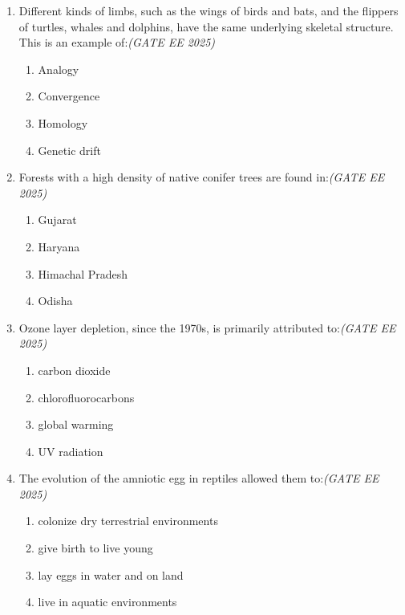 \begin{enumerate}[leftmargin=*,label=\textbf{Q.\arabic*}]

\item Different kinds of limbs, such as the wings of birds and bats, and the flippers of turtles, whales and dolphins, have the same underlying skeletal structure. This is an example of:\hfill \textit{(GATE EE 2025)}
\begin{multicols}{2}
\begin{enumerate}[label=(\Alph*)]
\item Analogy
\item Convergence
\item Homology
\item Genetic drift
\end{enumerate}
\end{multicols}

\item Forests with a high density of native conifer trees are found in:\hfill \textit{(GATE EE 2025)}
\begin{multicols}{2}
\begin{enumerate}[label=(\Alph*)]
\item Gujarat
\item Haryana
\item Himachal Pradesh
\item Odisha
\end{enumerate}
\end{multicols}

\item Ozone layer depletion, since the 1970s, is primarily attributed to:\hfill \textit{(GATE EE 2025)}
\begin{multicols}{2}
\begin{enumerate}[label=(\Alph*)]
\item carbon dioxide
\item chlorofluorocarbons
\item global warming
\item UV radiation
\end{enumerate}
\end{multicols}

\item The evolution of the amniotic egg in reptiles allowed them to:\hfill \textit{(GATE EE 2025)}
\begin{multicols}{2}
\begin{enumerate}[label=(\Alph*)]
\item colonize dry terrestrial environments
\item give birth to live young
\item lay eggs in water and on land
\item live in aquatic environments
\end{enumerate}
\end{multicols}


\end{enumerate}
